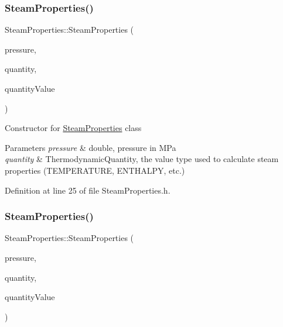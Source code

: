 \subsubsection{\texorpdfstring{Steam\+Properties()}{SteamProperties()}\hspace{0.1cm}{\footnotesize\ttfamily [2/3]}}
{\footnotesize\ttfamily Steam\+Properties\+::\+Steam\+Properties (\begin{DoxyParamCaption}\item[{const double}]{pressure,  }\item[{const \hyperlink{class_steam_properties_ae0294bedf7d178c2d8fb6aed0f62fbff}{Thermodynamic\+Quantity}}]{quantity,  }\item[{const double}]{quantity\+Value }\end{DoxyParamCaption})\hspace{0.3cm}{\ttfamily [inline]}}

Constructor for \hyperlink{class_steam_properties}{Steam\+Properties} class 
\begin{DoxyParams}{Parameters}
{\em pressure} & double, pressure in M\+Pa \\
\hline
{\em quantity} & Thermodynamic\+Quantity, the value type used to calculate steam properties (T\+E\+M\+P\+E\+R\+A\+T\+U\+RE, E\+N\+T\+H\+A\+L\+PY, etc.) \\
\hline
\end{DoxyParams}


Definition at line 25 of file Steam\+Properties.\+h.

\mbox{\label{class_steam_properties_a976e08ed0433943d469a8c2f75d2ac68}} 
\subsubsection{\texorpdfstring{Steam\+Properties()}{SteamProperties()}\hspace{0.1cm}{\footnotesize\ttfamily [3/3]}}
{\footnotesize\ttfamily Steam\+Properties\+::\+Steam\+Properties (\begin{DoxyParamCaption}\item[{const double}]{pressure,  }\item[{const \hyperlink{class_steam_properties_ae0294bedf7d178c2d8fb6aed0f62fbff}{Thermodynamic\+Quantity}}]{quantity,  }\item[{const double}]{quantity\+Value }\end{DoxyParamCaption})\hspace{0.3cm}{\ttfamily [inline]}}

